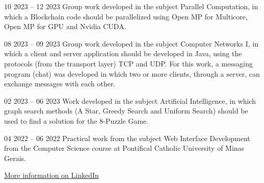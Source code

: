 \documentclass[10pt,a4paper,ragged2e,withhyper]{altacv}
\begin{document}
\begin{paracol}{2}
            {
            }{10 2023 -- 12 2023}{}
            Group work developed in the subject Parallel Computation, in which a Blockchain code should be parallelized using Open MP for Multicore, Open MP for GPU and Nvidia CUDA.\\
            \divider

            {
            }{08 2023 -- 09 2023}{}
            Group work developed in the subject Computer Networks I, in which a client and server application should be developed in Java, using the protocols (from the transport layer) TCP and UDP. For this work, a messaging program (chat) was developed in which two or more clients, through a server, can exchange messages with each other.\\
            \divider
        
            {
            }{02 2023 -- 06 2023}{}
            Work developed in the subject Artificial Intelligence, in which graph search methods (A Star, Greedy Search and Uniform Search) should be used to find a solution for the 8-Puzzle Game.\\
            \divider
            
            {
            }{04 2022 -- 06 2022}{}
            Practical work from the subject Web Interface Development from the Computer Science course at Pontifical Catholic University of Minas Gerais.\\
            \divider

            {\large\color{emphasis}\href{https://www.linkedin.com/in/henriquemcc/details/projects/}{More information on LinkedIn}}
    \end{paracol}
\end{document}
